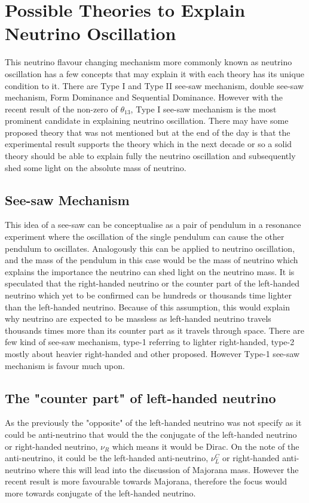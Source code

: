 \documentclass[11pt ,a4paper]{article}
\begin{document}
\section*{Possible Theories to Explain Neutrino Oscillation}
This neutrino flavour changing mechanism more commonly known as neutrino oscillation has a few concepts that may explain it with each theory has its unique condition to it. There are Type I and Type II see-saw mechanism, double see-saw mechanism, Form Dominance and Sequential Dominance. However with the recent result of the non-zero of \(\theta_{13} \), Type I see-saw mechanism is the most prominent candidate in explaining neutrino oscillation. There may have some proposed theory that was not mentioned but at the end of the day is that the experimental result supports the theory which in the next decade or so a solid theory should be able to explain fully the neutrino oscillation and subsequently shed some light on the absolute mass of neutrino.\cite{massmodel}\cite{king07}
\subsection*{See-saw Mechanism}
This idea of a see-saw can be conceptualise as a pair of pendulum in a resonance experiment where the oscillation of the single pendulum can cause the other pendulum to oscillates. Analogously this can be applied to neutrino oscillation, and the mass of the pendulum in this case would be the mass of neutrino which explains the importance the neutrino can shed light on the neutrino mass. It is speculated that the right-handed neutrino or the counter part of the left-handed neutrino which yet to be confirmed can be hundreds or thousands time lighter than the left-handed neutrino. Because of this assumption, this would explain why neutrino are expected to be massless as left-handed neutrino travels thousands times more than its counter part as it travels through space.\cite{king07}\cite{massmodel} There are few kind of see-saw mechanism, type-1 referring to lighter right-handed, type-2 mostly about heavier right-handed and other proposed. However Type-1 see-saw mechanism is favour much upon.
\cite{chen}
\subsection*{The "counter part" of left-handed neutrino}
As the previously the "opposite" of the left-handed neutrino was not specify as it could be anti-neutrino that would the the conjugate of the left-handed neutrino or right-handed neutrino, \(\nu_R \) which means it would be Dirac. On the note of the anti-neutrino, it could be the left-handed anti-neutrino, \(\nu_{L}^C \) or right-handed anti-neutrino where this will lead into the discussion of Majorana mass. However the recent result is more favourable towards Majorana, therefore the focus would more towards conjugate of the left-handed neutrino.
\end{document}
